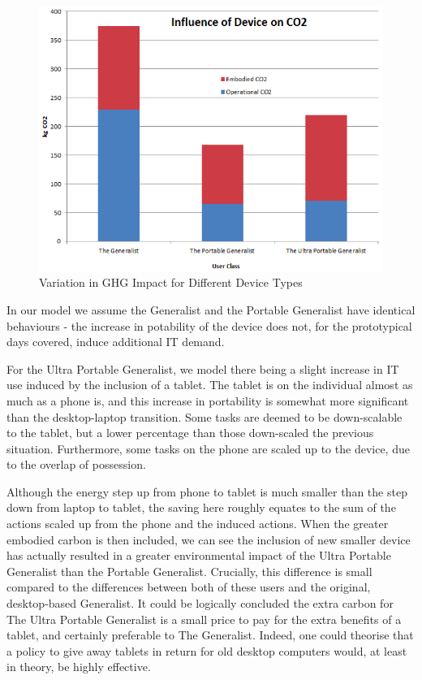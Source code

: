 \documentclass[conference]{IEEEtran}
\begin{document}
\begin{figure}[!ht]
\centering
\includegraphics[width=\columnwidth]{images/ghgimpact_devicetypes.png}
\caption{Variation in GHG Impact for Different Device Types}
\label{fig:ghgimpact_devicetype} 
\end{figure}

In our model we assume the Generalist and the Portable Generalist have
identical behaviours - the increase in potability of the device does
not, for the prototypical days covered, induce additional IT
demand. 


For the Ultra Portable Generalist, we model there being a slight
increase in IT use induced by the inclusion of a tablet. The tablet is
on the individual almost as much as a phone is, and this increase in
portability is somewhat more significant than the desktop-laptop
transition. Some tasks are deemed to be down-scalable to the tablet,
but a lower percentage than those down-scaled the previous
situation. Furthermore, some tasks on the phone are scaled up to the
device, due to the overlap of possession.

Although the energy step up from phone to tablet is much smaller than
the step down from laptop to tablet, the saving here roughly equates
to the sum of the actions scaled up from the phone and the induced
actions. When the greater embodied carbon is then included, we can see
the inclusion of new smaller device has actually resulted in a greater
environmental impact of the Ultra Portable Generalist than the
Portable Generalist.  Crucially, this difference is small compared to
the differences between both of these users and the original,
desktop-based Generalist. It could be logically concluded the extra
carbon for The Ultra Portable Generalist is a small price to pay for
the extra benefits of a tablet, and certainly preferable to The
Generalist. Indeed, one could theorise that a policy to give away
tablets in return for old desktop computers would, at least in theory,
be highly effective.
\end{document}
